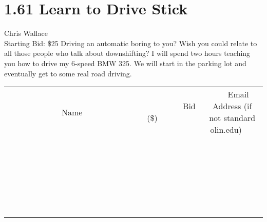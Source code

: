 \documentclass[11pt]{article}
\begin{document}
\section*{1.61 Learn to Drive Stick}
Chris Wallace
\\
Starting Bid: \$25
\newline
Driving an automatic boring to you? Wish you could relate to all those people who talk about downshifting? I will spend two hours teaching you how to drive my 6-speed BMW 325. We will start in the parking lot and eventually get to some real road driving.
\\[6ex]
\begin{tabular}{c c c}
~~~~~~~~~~~~~Name~~~~~~~~~~~~~ & ~~~~~~~~~Bid (\$)~~~~~~~~~  & ~~~Email Address (if not standard olin.edu)~~~\\
 & & \\
\hline
 & & \\
\hline
 & & \\
\hline
 & & \\
\hline
 & & \\
\hline
 & & \\
\hline
 & & \\
\hline
 & & \\
\hline
 & & \\
\hline
 & & \\
\hline
 & & \\
\hline
 & & \\
\hline
 & & \\
\hline
 & & \\
\hline
 & & \\
\hline
 & & \\
\hline
 & & \\
\hline
 & & \\
\hline
 & & \\
\hline
 & & \\
\hline
 & & \\
\hline
 & & \\
\hline
 & & \\
\hline
 & & \\
\hline
 & & \\
\hline
 & & \\
\hline
\end{tabular}
\newpage
\end{document}
